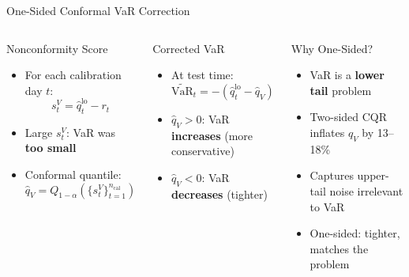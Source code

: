 \documentclass[9pt, aspectratio=169, t]{beamer}
\newcommand{\VaR}{\mathrm{VaR}}
\newcommand{\qV}{\hat{q}_V}
\begin{document}
\begin{frame}{One-Sided Conformal VaR Correction}
	\vspace{-0.3cm}
	{\scriptsize
	\begin{columns}[T]
		\begin{block}{Nonconformity Score}
		\begin{itemize}\setlength{\itemsep}{0pt}
			\item For each calibration day $t$:
			\vspace{-2mm}\[s_t^V = \hat{q}_t^{\mathrm{lo}} - r_t\]\vspace{-5mm}
			\item Large $s_t^V$: VaR was \textbf{too small}
			\item Conformal quantile:
			\vspace{-2mm}\[\qV = Q_{1-\alpha}\!\left(\{s_t^V\}_{t=1}^{n_{\mathrm{cal}}}\right)\]\vspace{-5mm}
		\end{itemize}
		\end{block}

		\begin{exampleblock}{Corrected VaR}
		\begin{itemize}\setlength{\itemsep}{0pt}
			\item At test time:
			\vspace{-2mm}\[\widetilde{\VaR}_t = -(\hat{q}_t^{\mathrm{lo}} - \qV)\]\vspace{-5mm}
			\item $\qV > 0$: VaR \textbf{increases} (more conservative)
			\item $\qV < 0$: VaR \textbf{decreases} (tighter)
		\end{itemize}
		\end{exampleblock}

		\begin{alertblock}{Why One-Sided?}
		\begin{itemize}\setlength{\itemsep}{0pt}
			\item VaR is a \textbf{lower tail} problem
			\item Two-sided CQR inflates $\qV$ by 13--18\%
			\item Captures upper-tail noise irrelevant to VaR
			\item One-sided: tighter, matches the problem
		\end{itemize}
		\end{alertblock}


\end{columns}}
\end{frame}
\end{document}
